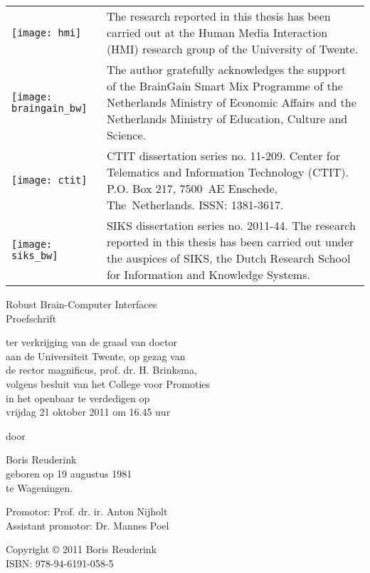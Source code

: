 \vfill
\noindent\begin{tabular}{@{}m{1.1cm} p{}}
  \texttt{[image: hmi]} & 
  The research reported in this thesis has been carried out at the Human Media Interaction (HMI) research group of the University of Twente.
  \vspace{.5ex}
\\
  \texttt{[image: braingain\_bw]} & 
  The author gratefully acknowledges the support of the BrainGain Smart Mix
  Programme of the Netherlands Ministry of Economic Affairs and the Netherlands
  Ministry of Education, Culture and Science.\vspace{.5ex}
\\

  \texttt{[image: ctit]} & 
  CTIT dissertation series no. 11-209. 
  Center for Telematics and Information Technology (CTIT). P.O. Box 217,  7500~AE Enschede, The~Netherlands. ISSN: 1381-3617.\\

  \texttt{[image: siks\_bw]} & 
  SIKS dissertation series no. 2011-44. The research reported in this thesis has
  been carried out under the auspices of SIKS, the Dutch Research School for
  Information and Knowledge Systems.\\
\end{tabular}

\clearpage \thispagestyle{empty}
\begin{center}
\vspace*{2.5cm}
{\LARGE \sc Robust Brain-Computer Interfaces}\\
\vspace*{1.5cm}
{\large \sc Proefschrift}

\vspace*{.5cm}
\begin{minipage}{.7 \textwidth}
ter verkrijging van de graad van doctor\\
aan de Universiteit Twente, op gezag van\\
de rector magnificus, prof. dr. H. Brinksma,\\
volgens besluit van het College voor Promoties\\
in het openbaar te verdedigen op\\
vrijdag 21 oktober 2011 om 16.45 uur
\end{minipage}

\vspace*{1cm}
door
\vspace*{1cm}

  \begin{minipage}{.7 \textwidth}
  {\Large Boris Reuderink}\\
  geboren op 19 augustus 1981\\
  te Wageningen.
\end{minipage}
\vfill
\end{center}

\clearpage
\noindent Promotor: Prof. dr. ir. Anton Nijholt\\
Assistant promotor: Dr. Mannes Poel

\vfill
\noindent Copyright \copyright{} 2011 Boris Reuderink\\
ISBN: 978-94-6191-058-5
